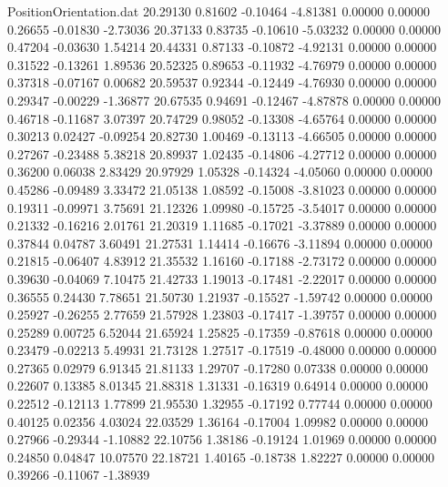 \begin{filecontents}{PositionOrientation.dat}
  20.29130    0.81602   -0.10464    -4.81381    0.00000    0.00000    0.26655   -0.01830   -2.73036
  20.37133    0.83735   -0.10610    -5.03232    0.00000    0.00000    0.47204   -0.03630    1.54214
  20.44331    0.87133   -0.10872    -4.92131    0.00000    0.00000    0.31522   -0.13261    1.89536
  20.52325    0.89653   -0.11932    -4.76979    0.00000    0.00000    0.37318   -0.07167    0.00682
  20.59537    0.92344   -0.12449    -4.76930    0.00000    0.00000    0.29347   -0.00229   -1.36877
  20.67535    0.94691   -0.12467    -4.87878    0.00000    0.00000    0.46718   -0.11687    3.07397
  20.74729    0.98052   -0.13308    -4.65764    0.00000    0.00000    0.30213    0.02427   -0.09254
  20.82730    1.00469   -0.13113    -4.66505    0.00000    0.00000    0.27267   -0.23488    5.38218
  20.89937    1.02435   -0.14806    -4.27712    0.00000    0.00000    0.36200    0.06038    2.83429
  20.97929    1.05328   -0.14324    -4.05060    0.00000    0.00000    0.45286   -0.09489    3.33472
  21.05138    1.08592   -0.15008    -3.81023    0.00000    0.00000    0.19311   -0.09971    3.75691
  21.12326    1.09980   -0.15725    -3.54017    0.00000    0.00000    0.21332   -0.16216    2.01761
  21.20319    1.11685   -0.17021    -3.37889    0.00000    0.00000    0.37844    0.04787    3.60491
  21.27531    1.14414   -0.16676    -3.11894    0.00000    0.00000    0.21815   -0.06407    4.83912
  21.35532    1.16160   -0.17188    -2.73172    0.00000    0.00000    0.39630   -0.04069    7.10475
  21.42733    1.19013   -0.17481    -2.22017    0.00000    0.00000    0.36555    0.24430    7.78651
  21.50730    1.21937   -0.15527    -1.59742    0.00000    0.00000    0.25927   -0.26255    2.77659
  21.57928    1.23803   -0.17417    -1.39757    0.00000    0.00000    0.25289    0.00725    6.52044
  21.65924    1.25825   -0.17359    -0.87618    0.00000    0.00000    0.23479   -0.02213    5.49931
  21.73128    1.27517   -0.17519    -0.48000    0.00000    0.00000    0.27365    0.02979    6.91345
  21.81133    1.29707   -0.17280     0.07338    0.00000    0.00000    0.22607    0.13385    8.01345
  21.88318    1.31331   -0.16319     0.64914    0.00000    0.00000    0.22512   -0.12113    1.77899
  21.95530    1.32955   -0.17192     0.77744    0.00000    0.00000    0.40125    0.02356    4.03024
  22.03529    1.36164   -0.17004     1.09982    0.00000    0.00000    0.27966   -0.29344   -1.10882
  22.10756    1.38186   -0.19124     1.01969    0.00000    0.00000    0.24850    0.04847   10.07570
  22.18721    1.40165   -0.18738     1.82227    0.00000    0.00000    0.39266   -0.11067   -1.38939

\end{filecontents}
